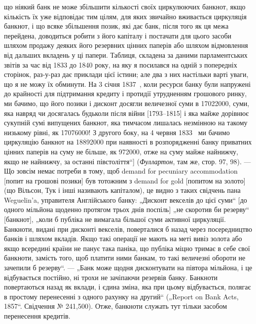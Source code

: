 {що ніякий банк не може збільшити кількості своїх циркулюючих банкнот,
якщо кількість їх уже відповідає тим цілям, для яких звичайно вживається циркуляція
банкнот, і що всяке збільшення позик, які дає банк, після того як ця межа
перейдена, доводиться робити з його капіталу і постачати для цього засоби
шляхом продажу деяких його резервних цінних паперів або шляхом відмовлення
від дальших вкладень у ці папери. Таблиця, складена за даними парламентських
звітів за час від 1833 до 1840 року, на яку я посилався на одній з попередніх
сторінок, раз-у-раз дає приклади цієї істини; але два з них настільки варті уваги,
що я не можу їх обминути. На 3 січня 1837~, коли ресурси банку були
напружені до крайності для підтримання кредиту і протидії утрудненням
грошового ринку, ми бачимо, що його позики і дисконт досягли величезної
суми в \num{17022000}, суми, яка навряд чи досягалась будьколи
після війни [1793--1815] і яка майже дорівнює сукупній сумі випущених
банкнот, яка тимчасом лишалась незмінною на такому низькому рівні,
як \num{17076000}! З другого боку, на 4 червня 1833~ ми бачимо
циркуляцію банкнот на \num{18892000} при наявності в розпорядженні
банку приватних цінних паперів на суму не більше, як \num{972000}, отже на суму майже найнижчу, якщо не найнижчу, за останні
півстоліття“] (\emph{Фуллартон}, там же, стор. 97, 98). — Що зовсім немає потреби
в тому, щоб demand for pecuniary accommodation [попит на грошові позики] був
тотожним з demand for gold [попитом на золото] (що Вільсон, Тук і інші називають
капіталом), це видно з таких свідчень пана Weguelin’a, управителя Англійського
банку: „Дисконт векселів до цієї суми“ [до одного мільйона щоденно
протягом трьох днів поспіль] „не скоротив би резерву“ [банкнот], „коли б публіка
не вимагала більшої суми активної циркуляції. Банкноти, видані при
дисконті векселів, поверталися б назад через посередництво банків і шляхом
вкладів. Якщо такі операції не мають на меті вивіз золота або якщо всередині
країни не панує така паніка, що публіка міцно тримає в себе свої банкноти,
замість того, щоб платити ними банкам, то такі величезні обороти не зачепили б
резерву“. — „Банк може щодня дисконтувати на півтора мільйона, і це відбувається
постійно, ні трохи не зачіпаючи резервів банку. Банкноти повертаються
назад як вклади, і єдина зміна, яка при цьому відбувається, полягає в простому
перенесенні з одного рахунку на другий“ („Report on Bank Acts, 1857“. Свідчення
№ 241,500). Отже, банкноти служать тут тільки засобом перенесення кредитів.
}

